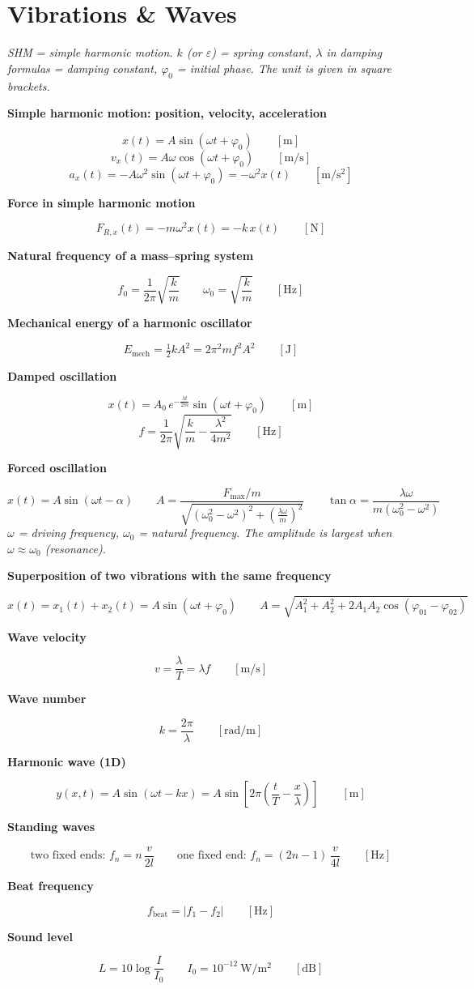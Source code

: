 \documentclass[11pt]{article}
\newcommand{\sect}[2]{\section*{\color{#1}#2}}
\newcommand{\sub}[1]{\par\medskip\textbf{#1}\par}
\newcommand{\expl}[1]{{\color{gray}\itshape #1}\par}
\begin{document}
\sect{cVib}{Vibrations \& Waves}
\expl{SHM = simple harmonic motion. $k$ (or $\varepsilon$) = spring constant, $\lambda$ in damping formulas = damping constant, $\varphi_0$ = initial phase. The unit is given in square brackets.}

\sub{Simple harmonic motion: position, velocity, acceleration}
\[ x(t) = A\sin(\omega t + \varphi_0) \qquad [\mathrm{m}] \]
\[ v_x(t) = A\omega\cos(\omega t + \varphi_0) \qquad [\mathrm{m/s}] \]
\[ a_x(t) = -A\omega^2\sin(\omega t + \varphi_0) = -\omega^2 x(t) \qquad [\mathrm{m/s^2}] \]

\sub{Force in simple harmonic motion}
\[ F_{R,x}(t) = -m\omega^2 x(t) = -k\,x(t) \qquad [\mathrm{N}] \]

\sub{Natural frequency of a mass–spring system}
\[ f_0 = \frac{1}{2\pi}\sqrt{\frac{k}{m}} \qquad \omega_0 = \sqrt{\frac{k}{m}} \qquad [\mathrm{Hz}] \]

\sub{Mechanical energy of a harmonic oscillator}
\[ E_{\text{mech}} = \tfrac{1}{2}k A^2 = 2\pi^2 m f^2 A^2 \qquad [\mathrm{J}] \]

\sub{Damped oscillation}
\[ x(t) = A_0\,e^{-\frac{\lambda t}{2m}}\sin(\omega t + \varphi_0) \qquad [\mathrm{m}] \]
\[ f = \frac{1}{2\pi}\sqrt{\frac{k}{m} - \frac{\lambda^2}{4m^2}} \qquad [\mathrm{Hz}] \]

\sub{Forced oscillation}
\[ x(t) = A\sin(\omega t - \alpha) \qquad A = \frac{F_{\max}/m}{\sqrt{\left(\omega_0^2 - \omega^2\right)^2 + \left(\frac{\lambda\omega}{m}\right)^2}} \qquad \tan\alpha = \frac{\lambda\omega}{m\left(\omega_0^2 - \omega^2\right)} \]
\expl{$\omega$ = driving frequency, $\omega_0$ = natural frequency. The amplitude is largest when $\omega \approx \omega_0$ (resonance).}

\sub{Superposition of two vibrations with the same frequency}
\[ x(t) = x_1(t) + x_2(t) = A\sin(\omega t + \varphi_0) \qquad A = \sqrt{A_1^2 + A_2^2 + 2A_1A_2\cos(\varphi_{01} - \varphi_{02})} \]

\sub{Wave velocity}
\[ v = \frac{\lambda}{T} = \lambda f \qquad [\mathrm{m/s}] \]

\sub{Wave number}
\[ k = \frac{2\pi}{\lambda} \qquad [\mathrm{rad/m}] \]

\sub{Harmonic wave (1D)}
\[ y(x, t) = A\sin(\omega t - kx) = A\sin\left[2\pi\left(\frac{t}{T} - \frac{x}{\lambda}\right)\right] \qquad [\mathrm{m}] \]

\sub{Standing waves}
\[ \text{two fixed ends: } f_n = n\,\frac{v}{2l} \qquad \text{one fixed end: } f_n = (2n - 1)\,\frac{v}{4l} \qquad [\mathrm{Hz}] \]

\sub{Beat frequency}
\[ f_{\text{beat}} = |f_1 - f_2| \qquad [\mathrm{Hz}] \]

\sub{Sound level}
\[ L = 10\log\frac{I}{I_0} \qquad I_0 = 10^{-12}\ \mathrm{W/m^2} \qquad [\mathrm{dB}] \]
\end{document}
